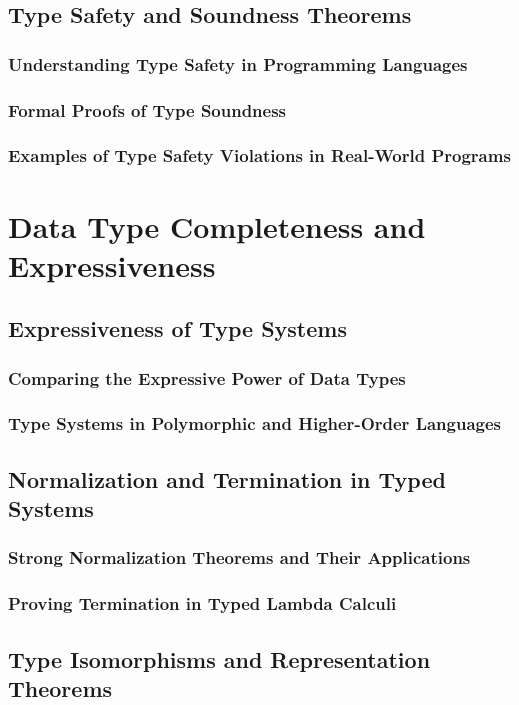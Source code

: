 \documentclass[12pt, oneside]{book}
\begin{document}
\subsection{Type Safety and Soundness Theorems}
\subsubsection{Understanding Type Safety in Programming Languages}
\subsubsection{Formal Proofs of Type Soundness}
\subsubsection{Examples of Type Safety Violations in Real-World Programs}

\section{Data Type Completeness and Expressiveness}
\subsection{Expressiveness of Type Systems}
\subsubsection{Comparing the Expressive Power of Data Types}
\subsubsection{Type Systems in Polymorphic and Higher-Order Languages}
\subsection{Normalization and Termination in Typed Systems}
\subsubsection{Strong Normalization Theorems and Their Applications}
\subsubsection{Proving Termination in Typed Lambda Calculi}
\subsection{Type Isomorphisms and Representation Theorems}
\end{document}
